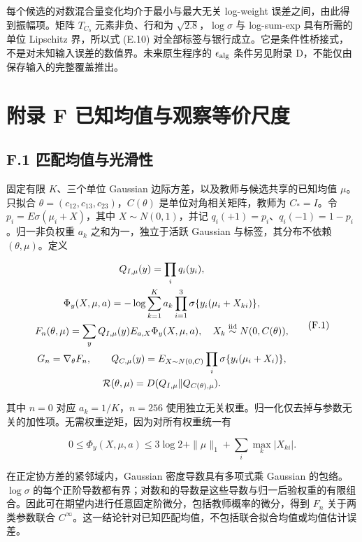 \documentclass[11pt,a4paper]{article}
\begin{document}
每个候选的对数混合量变化均介于最小与最大无关 log-weight
误差之间，由此得到振幅项。矩阵 \(T_{C_b}\) 元素非负、行和为
\(\sqrt{2.8}\)，\(\log\sigma\) 与 log-sum-exp 具有所需的单位 Lipschitz
界，所以式 (E.10)
对全部标签与银行成立。它是条件性桥接式，不是对未知输入误差的数值界。未来原生程序的
\(\epsilon_{\rm alg}\) 条件另见附录 D，不能仅由保存输入的完整覆盖推出。

\clearpage

\section*{附录 F
已知均值与观察等价尺度}\label{ux9644ux5f55-f-ux5df2ux77e5ux5747ux503cux4e0eux89c2ux5bdfux7b49ux4ef7ux5c3aux5ea6}

\subsection*{F.1
匹配均值与光滑性}\label{f.1-ux5339ux914dux5747ux503cux4e0eux5149ux6ed1ux6027}

固定有限 \(K\)、三个单位 Gaussian 边际方差，以及教师与候选共享的已知均值
\(\mu\)。只拟合 \(\theta=(c_{12},c_{13},c_{23})\)，\(C(\theta)\)
是单位对角相关矩阵，教师为 \(C_*=I\)。令 \(p_i=E\sigma(\mu_i+X)\)，其中
\(X\sim N(0,1)\)，并记 \(q_i(+1)=p_i\)、\(q_i(-1)=1-p_i\)。归一非负权重
\(a_k\) 之和为一，独立于活跃 Gaussian 与标签，其分布不依赖
\((\theta,\mu)\)。定义

\[
\begin{gathered}
Q_{I,\mu}(y)=\prod_iq_i(y_i),\\
\Phi_y(X,\mu,a)=-\log\sum_{k=1}^Ka_k\prod_{i=1}^3\sigma\{y_i(\mu_i+X_{ki})\},\\
F_n(\theta,\mu)=\sum_yQ_{I,\mu}(y)E_{a,X}\Phi_y(X,\mu,a),\quad X_k\stackrel{\rm iid}{\sim}N(0,C(\theta)),\\
G_n=\nabla_\theta F_n,\qquad
Q_{C,\mu}(y)=E_{X\sim N(0,C)}\prod_i\sigma\{y_i(\mu_i+X_i)\},\\
\mathcal R(\theta,\mu)=D(Q_{I,\mu}\Vert Q_{C(\theta),\mu}).
\end{gathered}
\tag{F.1}
\]

其中 \(n=0\) 对应 \(a_k=1/K\)，\(n=256\)
使用独立无关权重。归一化仅去掉与参数无关的加性项。无需权重逆矩，因为对所有权重统一有

\[
0\le\Phi_y(X,\mu,a)\le3\log2+\|\mu\|_1+\sum_i\max_k|X_{ki}|.
\tag{F.2}
\]

在正定协方差的紧邻域内，Gaussian 密度导数具有多项式乘 Gaussian
的包络。\(\log\sigma\)
的每个正阶导数都有界；对数和的导数是这些导数与归一后验权重的有限组合。因此可在期望内进行任意固定阶微分，包括教师概率的微分，得到
\(F_n\) 关于两类参数联合
\(C^\infty\)。这一结论针对已知匹配均值，不包括联合拟合均值或均值估计误差。
\end{document}
